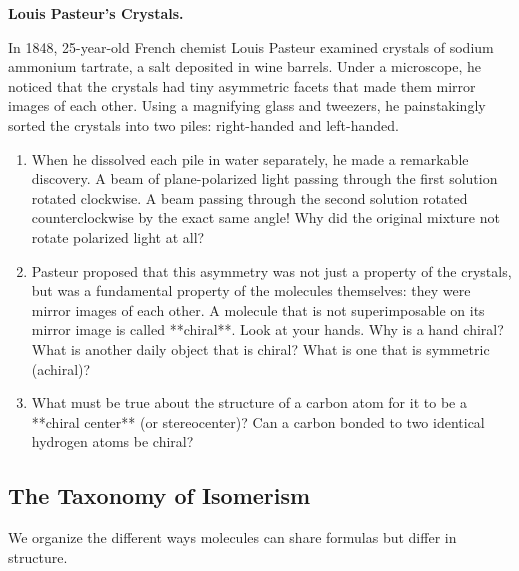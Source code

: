 \documentclass[12pt, a4paper]{book}
\begin{document}
\begin{puzzlebox}
\textbf{Louis Pasteur's Crystals.}

In 1848, 25-year-old French chemist Louis Pasteur examined crystals of sodium ammonium tartrate, a salt deposited in wine barrels. Under a microscope, he noticed that the crystals had tiny asymmetric facets that made them mirror images of each other.
Using a magnifying glass and tweezers, he painstakingly sorted the crystals into two piles: right-handed and left-handed.
\begin{enumerate}[label=(\alph*), leftmargin=*]
  \item When he dissolved each pile in water separately, he made a remarkable discovery.
        A beam of plane-polarized light passing through the first solution rotated clockwise. A beam passing through the second solution rotated counterclockwise by the exact same angle!
        Why did the original mixture not rotate polarized light at all?
  \item Pasteur proposed that this asymmetry was not just a property of the crystals, but was a fundamental property of the molecules themselves: they were mirror images of each other.
        A molecule that is not superimposable on its mirror image is called **chiral**.
        Look at your hands. Why is a hand chiral? What is another daily object that is chiral? What is one that is symmetric (achiral)?
  \item What must be true about the structure of a carbon atom for it to be a **chiral center** (or stereocenter)? Can a carbon bonded to two identical hydrogen atoms be chiral?
\end{enumerate}
\end{puzzlebox}

\subsection{The Taxonomy of Isomerism}

We organize the different ways molecules can share formulas but differ in structure.
\end{document}
